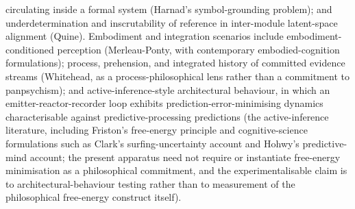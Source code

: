 \documentclass[a4paper,12pt]{article}
\begin{document}
circulating inside a formal system (Harnad's symbol-grounding
problem); and underdetermination and inscrutability of reference
in inter-module latent-space alignment (Quine). Embodiment and
integration scenarios include embodiment-conditioned perception
(Merleau-Ponty, with contemporary embodied-cognition formulations);
process, prehension, and integrated history of committed evidence
streams (Whitehead, as a process-philosophical lens rather than a
commitment to panpsychism); and active-inference-style
architectural behaviour, in which an emitter-reactor-recorder loop
exhibits prediction-error-minimising dynamics characterisable
against predictive-processing predictions (the active-inference
literature, including Friston's free-energy principle and
cognitive-science formulations such as Clark's surfing-uncertainty
account and Hohwy's predictive-mind account; the present apparatus
need not require or instantiate free-energy minimisation as a
philosophical commitment, and the experimentalisable claim is to
architectural-behaviour testing rather than to measurement of the
philosophical free-energy construct itself).
\end{document}
